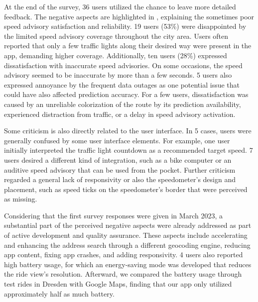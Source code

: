 At the end of the survey, 36 users utilized the chance to leave more detailed feedback. The negative aspects are highlighted in , explaining the sometimes poor speed advisory satisfaction and reliability. 19 users (53\%) were disappointed by the limited speed advisory coverage throughout the city area. Users often reported that only a few traffic lights along their desired way were present in the app, demanding higher coverage. Additionally, ten users (28\%) expressed dissatisfaction with inaccurate speed advisories. On some occasions, the speed advisory seemed to be inaccurate by more than a few seconds. 5 users also expressed annoyance by the frequent data outages as one potential issue that could have also affected prediction accuracy. For a few users, dissatisfaction was caused by an unreliable colorization of the route by its prediction availability, experienced distraction from traffic, or a delay in speed advisory activation.

Some criticism is also directly related to the user interface. In 5 cases, users were generally confused by some user interface elements. For example, one user initially interpreted the traffic light countdown as a recommended target speed. 7 users desired a different kind of integration, such as a bike computer or an auditive speed advisory that can be used from the pocket. Further criticism regarded a general lack of responsivity or also the speedometer's design and placement, such as speed ticks on the speedometer's border that were perceived as missing.

Considering that the first survey responses were given in March 2023, a substantial part of the perceived negative aspects were already addressed as part of active development and quality assurance. These aspects include accelerating and enhancing the address search through a different geocoding engine, reducing app content, fixing app crashes, and adding responsivity. 4 users also reported high battery usage, for which an energy-saving mode was developed that reduces the ride view's resolution. Afterward, we compared the battery usage through test rides in Dresden with Google Maps, finding that our app only utilized approximately half as much battery.

